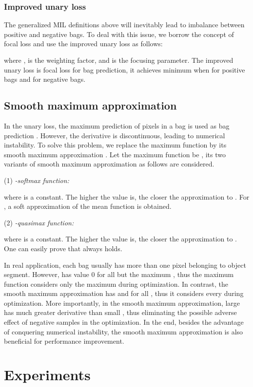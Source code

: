 \documentclass[runningheads]{llncs}
\begin{document}
\subsubsection{Improved unary loss}
The generalized MIL definitions above will inevitably lead to imbalance between positive and negative bags. To deal with this issue, we borrow the concept of focal loss \cite{ross2017focal} and use the improved unary loss as follows:

where ,  is the weighting factor, and  is the focusing parameter. The improved unary loss is focal loss for bag prediction, it achieves minimum when  for positive bags and  for negative bags.

\subsection{Smooth maximum approximation}


In the unary loss, the maximum prediction of pixels in a bag is used as bag prediction . However, the derivative  is discontinuous, leading to numerical instability. To solve this problem, we replace the maximum function by its smooth maximum approximation \cite{lange2014applications}. Let the maximum function be , its two variants of smooth maximum approximation as follows are considered. 

(1) \textit{-softmax function:}

where  is a constant. The higher the  value is, the closer the approximation  to . For , a soft approximation of the mean function is obtained.

(2) \textit{-quasimax function:}

where  is a constant. The higher the  value is, the closer the approximation  to . One can easily prove that  always holds.

In real application, each bag usually has more than one pixel belonging to object segment. However,  has value 0 for all but the maximum , thus the maximum function considers only the maximum  during optimization. In contrast, the smooth maximum approximation has  and  for all , thus it considers every  during optimization. More importantly, in the smooth maximum approximation, large  has much greater derivative than small , thus eliminating the possible adverse effect of negative samples in the optimization. In the end, besides the advantage of conquering numerical instability, the smooth maximum approximation is also beneficial for performance improvement.

\section{Experiments}
\end{document}
